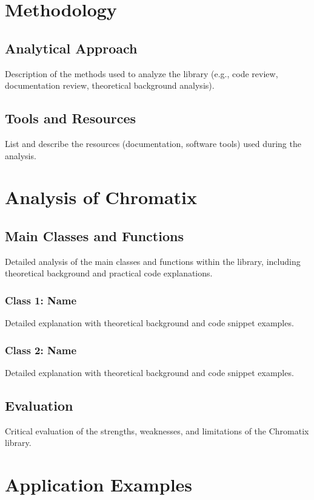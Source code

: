 \documentclass[a4paper,12pt]{report}
\begin{document}
\chapter{Methodology}
\section{Analytical Approach}
Description of the methods used to analyze the library (e.g., code review, documentation review, theoretical background analysis).

\section{Tools and Resources}
List and describe the resources (documentation, software tools) used during the analysis.

\chapter{Analysis of Chromatix}
\section{Main Classes and Functions}
Detailed analysis of the main classes and functions within the library, including theoretical background and practical code explanations.

\subsection{Class 1: Name}
Detailed explanation with theoretical background and code snippet examples.

\subsection{Class 2: Name}
Detailed explanation with theoretical background and code snippet examples.


\section{Evaluation}
Critical evaluation of the strengths, weaknesses, and limitations of the Chromatix library.

\chapter{Application Examples}
\end{document}
